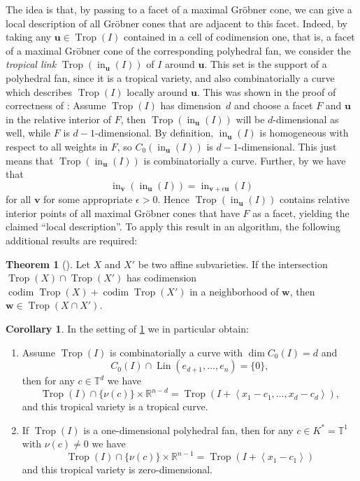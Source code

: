 \documentclass[
  paper=a4,
  titlepage,
  bibliography=totoc,
  pagesize=pdftex
]{scrartcl}
\numberwithin{figure}{section}
\numberwithin{equation}{section}
\numberwithin{table}{section}
\newcommand*\setR{\mathds{R}}
\newcommand*\setT{\mathds{T}}
\newcommand*\ideal[1]{\left\langle #1 \right\rangle}
\let\vec\mathbf
\DeclareMathOperator{\Trop}{Trop}
\DeclareMathOperator{\initial}{in}
\DeclareMathOperator{\Lin}{Lin}
\DeclareMathOperator{\codim}{codim}
\theoremstyle{definition}
\newtheorem{theorem}[definition]{Theorem}
\newtheorem{corollary}[definition]{Corollary}
\numberwithin{definition}{section}
\begin{document}
The idea is that, by passing to a facet of a maximal Gröbner cone, we can give a local
description of all Gröbner cones that are adjacent to this facet. Indeed, by taking any
$\vec u \in \Trop(I)$ contained in a cell of codimension one, that is, a facet of a
maximal Gröbner cone of the corresponding polyhedral fan, we consider the \emph{tropical
link} $\Trop(\initial_{\vec u}(I))$ of $I$ around $\vec u$. This set is the support of a
polyhedral fan, since it is a tropical variety, and also combinatorially a curve which
describes $\Trop(I)$ locally around $\vec u$. This was shown in the proof of correctness
of \cite[Algorithm~4.10]{compTropVar}: Assume $\Trop(I)$ has dimension~$d$ and choose a
facet $F$ and $\vec u$ in the relative interior of $F$, then $\Trop(\initial_{\vec u}(I))$
will be $d$-dimensional as well, while $F$ is $d-1$-dimensional. By definition,
$\initial_{\vec u}(I)$ is homogeneous with respect to all weights in $F$, so
$C_0(\initial_{\vec u}(I))$ is $d-1$-dimensional. This just means that
$\Trop(\initial_{\vec u}(I))$ is combinatorially a curve. Further, by
\cite[Proposition~1.13]{SturmGBCP} we have that
\[
  \initial_{\vec v}(\initial_{\vec u}(I)) = \initial_{\vec v + \epsilon \vec u}(I)
\]
for all $\vec v$ for some appropriate $\epsilon>0$. Hence $\Trop(\initial_{\vec u}(I))$
contains relative interior points of all maximal Gröbner cones that have $F$ as a facet,
yielding the claimed \enquote{local description}. To apply this result in an algorithm,
the following additional results are required:

\begin{theorem}[{\cite[Theorem~1.1]{ossTropLift}}]
  \label{thm:tropInt}
  Let $X$ and $X'$ be two affine subvarieties. If the intersection $\Trop(X) \cap
  \Trop(X')$ has codimension $\codim\Trop(X) + \codim\Trop(X')$ in a neighborhood of $\vec
  w$, then $\vec w \in \Trop(X\cap X')$.
\end{theorem}

\begin{corollary} \label{cor:tropInt}
  In the setting of \ref{thm:tropInt} we in particular obtain:
  \begin{enumerate}
    \item Assume $\Trop(I)$ is combinatorially a curve with $\dim C_0(I) = d$ and
      \[
        C_0(I)\cap \Lin(e_{d+1}, \dots, e_n) = \{0\},
      \]
      then for any $c \in \setT^d$ we have
      \[
        \Trop(I) \cap \{\nu(c)\} \times \setR^{n-d} = \Trop(I + \ideal{x_1-c_1, \dots,
        x_d-c_d}),
      \]
      and this tropical variety is a tropical curve.
      \label{cor:i}
    \item If $\Trop(I)$ is a one-dimensional polyhedral fan, then for any $c \in K^* =
      \setT^1$ with $\nu(c)\neq0$ we have
      \[
        \Trop(I) \cap \{\nu(c)\} \times \setR^{n-1} = \Trop(I + \ideal{x_1-c_1})
      \]
      and this tropical variety is zero-dimensional.
      \label{cor:ii}
  \end{enumerate}
\end{corollary}
\end{document}
